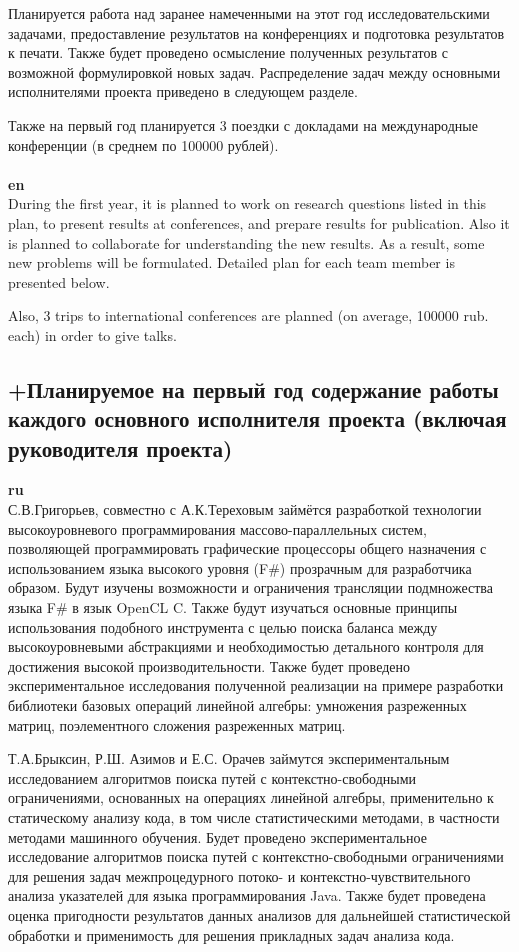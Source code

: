 \documentclass[12pt]{article}  %
\theoremstyle{remark}
\begin{document}
Планируется работа над заранее намеченными на этот год исследовательскими задачами, предоставление результатов на конференциях и подготовка результатов к печати. Также будет проведено осмысление полученных результатов с возможной формулировкой новых задач. Распределение задач между основными исполнителями проекта приведено в следующем разделе.

Также на первый год планируется 3 поездки с докладами на международные конференции (в среднем по 100000 рублей).
\\
\\
\textbf{en}\\
During the first year, it is planned to work on research questions listed in this plan, to present results at conferences, and prepare results for publication. Also it is planned to collaborate for understanding the new results. As a result, some new problems will be formulated. Detailed plan for each team member is presented below.

Also, 3 trips to international conferences are planned (on average, 100000 rub. each) in order to give talks.



\subsection{+Планируемое на первый год содержание работы каждого основного исполнителя проекта (включая руководителя проекта)}

\textbf{ru}\\

С.В.Григорьев, совместно с А.К.Тереховым займётся разработкой технологии высокоуровневого программирования массово-параллельных систем, позволяющей программировать графические процессоры общего назначения с использованием языка высокого уровня (F#) прозрачным для разработчика образом. Будут изучены возможности и ограничения трансляции подмножества языка F# в язык OpenCL C. Также будут изучаться основные принципы использования подобного инструмента с целью поиска баланса между высокоуровневыми абстракциями и необходимостью детального контроля для достижения высокой производительности. Также будет проведено экспериментальное исследования полученной реализации на примере разработки библиотеки базовых операций линейной алгебры: умножения разреженных матриц, поэлементного сложения разреженных матриц.

Т.А.Брыксин, Р.Ш. Азимов и Е.С. Орачев займутся экспериментальным исследованием алгоритмов поиска путей с контекстно-свободными ограничениями, основанных на операциях линейной алгебры, применительно к статическому анализу кода, в том числе статистическими методами, в частности методами машинного обучения. Будет проведено экспериментальное исследование алгоритмов поиска путей с контекстно-свободными ограничениями для решения задач межпроцедурного потоко- и контекстно-чувствительного анализа указателей для языка программирования Java. Также будет проведена оценка пригодности результатов данных анализов для дальнейшей статистической обработки и применимость для решения прикладных задач анализа кода.
\end{document}
